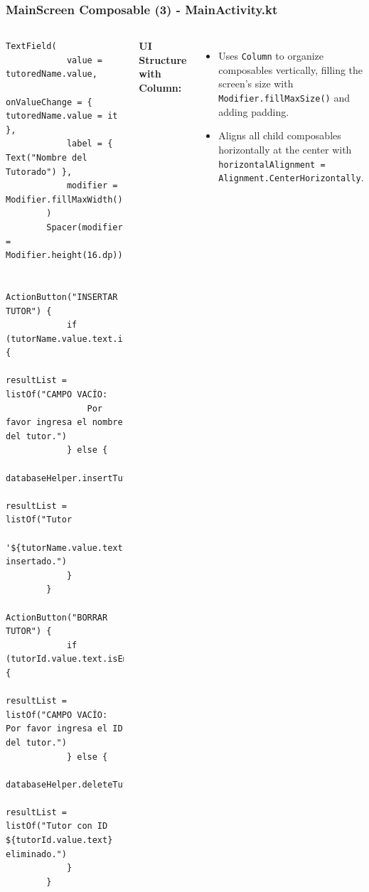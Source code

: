 \documentclass[pdf,
serif,
compress,
xcolor=table,
dvipsnames,
spanish,
aspectratio=169]{beamer}
\begin{document}

\begin{frame}[fragile]
    \frametitle{MainScreen Composable (3) - MainActivity.kt}
\begin{columns}
\begin{verbatim}
TextField(
            value = tutoredName.value,
            onValueChange = { tutoredName.value = it },
            label = { Text("Nombre del Tutorado") },
            modifier = Modifier.fillMaxWidth()
        )
        Spacer(modifier = Modifier.height(16.dp))
       
        ActionButton("INSERTAR TUTOR") {
            if (tutorName.value.text.isEmpty()) {
                resultList = listOf("CAMPO VACÍO: 
                Por favor ingresa el nombre del tutor.")
            } else {
                databaseHelper.insertTutor(tutorName.value.text)
                resultList = listOf("Tutor 
                '${tutorName.value.text}' insertado.")
            }
        }
        ActionButton("BORRAR TUTOR") {
            if (tutorId.value.text.isEmpty()) {
                resultList = listOf("CAMPO VACÍO: Por favor ingresa el ID del tutor.")
            } else {
                databaseHelper.deleteTutor(tutorId.value.text.toLong())
                resultList = listOf("Tutor con ID ${tutorId.value.text} eliminado.")
            }
        }
\end{verbatim}
\item \tiny \textbf{UI Structure with Column:}
    \begin{itemize}\tiny
        \item Uses \texttt{Column} to organize composables vertically, filling the screen’s size with \texttt{Modifier.fillMaxSize()} and adding padding.
        \item Aligns all child composables horizontally at the center with \texttt{horizontalAlignment = Alignment.CenterHorizontally}.
    \end{itemize}
\end{columns}
\end{frame}

\end{document}
